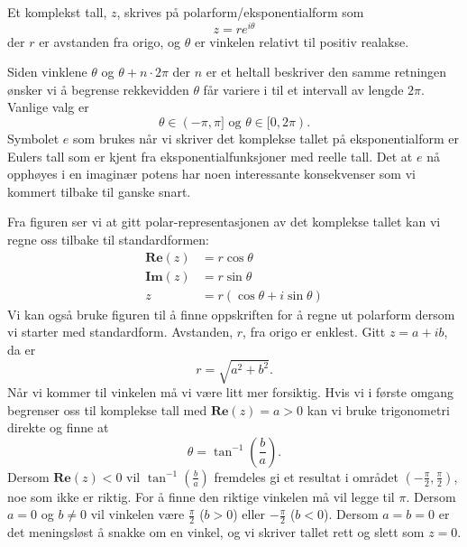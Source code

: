\documentclass[a4paper,norsk,12pt]{article}
\begin{document}
\begin{tdef}
Et komplekst tall, $z$, skrives på polarform/eksponentialform som 
\begin{displaymath}
	z = re^{i\theta}
\end{displaymath}
der $r$ er avstanden fra origo, og $\theta$ er vinkelen relativt til positiv realakse. 
\end{tdef}
\noindent
Siden vinklene $\theta$ og $\theta+n\cdot 2\pi$ der $n$ er et heltall beskriver den samme retningen ønsker vi å begrense rekkevidden $\theta$ får variere i til et intervall av lengde $2\pi$. Vanlige valg er
\begin{displaymath}
	\theta \in (-\pi, \pi] \text{ og } \theta \in [0, 2\pi).
\end{displaymath}
Symbolet $e$ som brukes når vi skriver det komplekse tallet på eksponentialform er Eulers tall som er kjent fra eksponentialfunksjoner med reelle tall. Det at $e$ nå opphøyes i en imaginær potens har noen interessante konsekvenser som vi kommert tilbake til ganske snart.

Fra figuren ser vi at gitt polar-representasjonen av det komplekse tallet kan vi regne oss tilbake til standardformen:
\begin{align*}
	\mathbf{Re}(z) &= r\cos\theta \\
	\mathbf{Im}(z) &= r\sin\theta \\
	z &= r(\cos\theta + i\sin\theta) 
\end{align*}
Vi kan også bruke figuren til å finne oppskriften for å regne ut polarform dersom vi starter med standardform. Avstanden, $r$, fra origo er enklest. Gitt $z=a + ib$, da er
\begin{displaymath}
	r = \sqrt{a^2 + b^2}.
\end{displaymath}
Når vi kommer til vinkelen må vi være litt mer forsiktig. Hvis vi i første omgang begrenser oss til komplekse tall med $\mathbf{Re}(z)=a>0$ kan vi bruke trigonometri direkte og finne at
\begin{displaymath}
	\theta = \tan^{-1}\left(\frac{b}{a}\right).
\end{displaymath}
Dersom $\mathbf{Re}(z)<0$ vil $\tan^{-1}\left(\frac{b}{a}\right)$ fremdeles gi et resultat i området $\left(-\frac{\pi}{2},\frac{\pi}{2}\right)$, noe som ikke er riktig. For å finne den riktige vinkelen må vil legge til $\pi$. Dersom $a=0$ og $b\neq0$ vil vinkelen være $\frac{\pi}{2}$ ($b>0$) eller $-\frac{\pi}{2}$ ($b<0$). Dersom $a=b=0$ er det meningsløst å snakke om en vinkel, og vi skriver tallet rett og slett som $z=0$.
\end{document}
